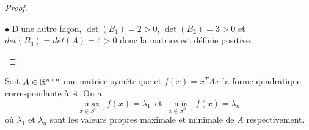 \begin{proof}
\begin{example}
$\bullet$ D'une autre façon, $\det(B_1)=2 >0$, $\det(B_2)=3 > 0$ et $det(B_3)=det(A)=4 >0$ donc la matrice est définie positive.

\end{example}
\end{proof}


\begin{theorem}
  \label{thr:18}
  Soit $A \in \mathbb{R}^{n\times n}$ une matrice symétrique et $f(x) = x^TAx$ la forme quadratique correspondante à $A$. On a
  \begin{equation}
    \label{eq:11}
    \max_{x \in S^{n-1}} f(x) = \lambda_1  \, \text{ et } \,  \min_{x \in S^{n-1}} f(x)  = \lambda_n
  \end{equation}
  où $\lambda_1$ et $\lambda_n$ sont les valeurs propres maximale et minimale de $A$ respectivement. 
\end{theorem}

